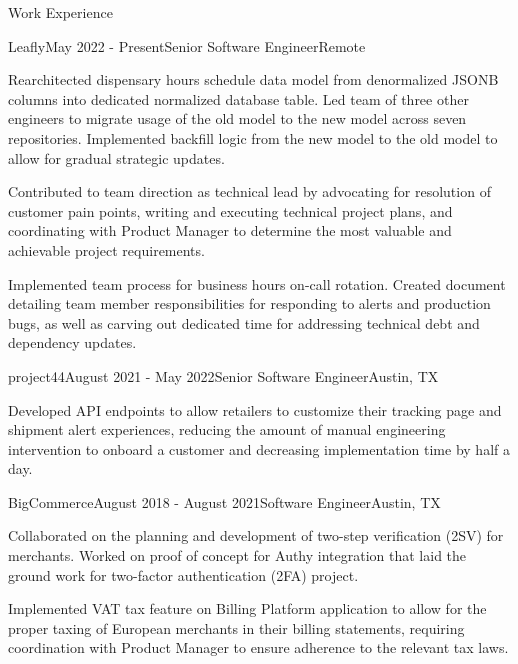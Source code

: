 \documentclass{resume} %
\begin{document}

\begin{rSection}{Work Experience}


\begin{rSubsection}{Leafly}{May 2022 - Present}{Senior Software Engineer}{Remote}
\item Rearchitected dispensary hours schedule data model from denormalized JSONB columns into dedicated normalized database table. Led team of
three other engineers to migrate usage of the old model to the new model across seven repositories. Implemented backfill logic from the new model
to the old model to allow for gradual strategic updates.
\item Contributed to team direction as technical lead by advocating for resolution of customer pain points, writing and executing technical project plans,
and coordinating with Product Manager to determine the most valuable and achievable project requirements.
\item Implemented team process for business hours on-call rotation. Created document detailing team member responsibilities for responding to alerts and
production bugs, as well as carving out dedicated time for addressing technical debt and dependency updates.
\end{rSubsection}


\begin{rSubsection}{project44}{August 2021 - May 2022}{Senior Software Engineer}{Austin, TX}
\item Developed API endpoints to allow retailers to customize their tracking page and shipment alert experiences, reducing the
amount of manual engineering intervention to onboard a customer and decreasing implementation time by half a day.
\end{rSubsection}


\begin{rSubsection}{BigCommerce}{August 2018 - August 2021}{Software Engineer}{Austin, TX}
\item Collaborated on the planning and development of two-step verification (2SV) for merchants. Worked on proof of concept for
Authy integration that laid the ground work for two-factor authentication (2FA) project.
\item Implemented VAT tax feature on Billing Platform application to allow for the proper taxing of European merchants in their billing
statements, requiring coordination with Product Manager to ensure adherence to the relevant tax laws.
\end{rSubsection}


\end{rSection}
\end{document}
